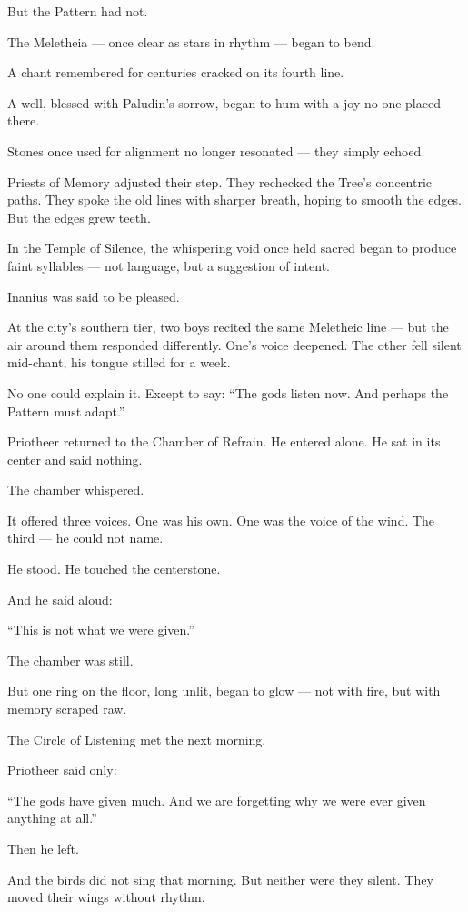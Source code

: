 \documentclass[12pt]{article}
\begin{document}
But the Pattern had not.

The Meletheia — once clear as stars in rhythm — began to bend. 

A chant remembered for centuries cracked on its fourth line.  

A well, blessed with Paludin’s sorrow, began to hum with a joy no one placed there.  

Stones once used for alignment no longer resonated — they simply echoed.

Priests of Memory adjusted their step.  
They rechecked the Tree’s concentric paths.  
They spoke the old lines with sharper breath, hoping to smooth the edges.  
But the edges grew teeth.

In the Temple of Silence, the whispering void once held sacred  
began to produce faint syllables —  
not language, but a suggestion of intent.

Inanius was said to be pleased.

At the city’s southern tier, two boys recited the same Meletheic line —  
but the air around them responded differently.  
One’s voice deepened. The other fell silent mid-chant,  
his tongue stilled for a week.

No one could explain it.  
Except to say:  
 “The gods listen now. And perhaps the Pattern must adapt.”

Priotheer returned to the Chamber of Refrain.  
He entered alone.  
He sat in its center and said nothing.

The chamber whispered.

It offered three voices.  
One was his own.  
One was the voice of the wind.  
The third — he could not name.

He stood.  
He touched the centerstone.

And he said aloud:

 “This is not what we were given.”

The chamber was still.

But one ring on the floor, long unlit,  
began to glow — not with fire,  
but with memory scraped raw.

The Circle of Listening met the next morning.

Priotheer said only:

 “The gods have given much.  
 And we are forgetting why we were ever given anything at all.”

Then he left.

And the birds did not sing that morning.  
But neither were they silent.  
They moved their wings without rhythm.
\end{document}
